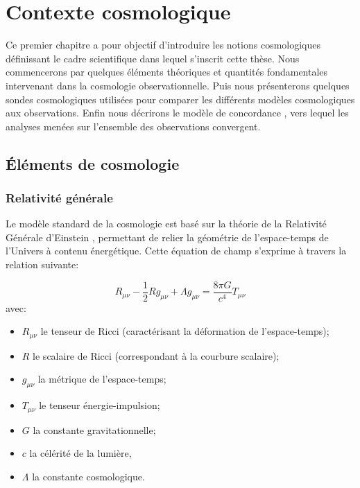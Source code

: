 \documentclass[../main/main.tex]{subfiles}
\begin{document}
\dominitoc
\faketableofcontents
\chapter{Contexte cosmologique}\label{cp:cosmo}

\minitoc
\vspace{2cm}
Ce premier chapitre a pour objectif d'introduire les notions
cosmologiques définissant le cadre scientifique dans lequel s'inscrit
cette thèse. Nous commencerons par quelques éléments
théoriques et quantités fondamentales intervenant dans la cosmologie observationnelle. Puis nous
présenterons quelques sondes cosmologiques utilisées pour comparer les
différents modèles
cosmologiques aux observations. Enfin nous décrirons le modèle de
concordance \lcdm, vers lequel les analyses menées sur l'ensemble des
observations convergent.
\newpage
\section{\'Eléments de cosmologie}\label{sec:11}

\subsection{Relativité générale}

Le modèle standard de la cosmologie est basé sur la théorie de la
Relativité Générale d'Einstein
\citep{Einstein1915c,Einstein1915a,Einstein1915b}, permettant de relier la géométrie
de l'espace-temps de l'Univers à contenu énergétique. Cette équation de champ s'exprime à travers la relation suivante:

\begin{equation}
  \label{eq:generalrelativity}
  R_{\mu\nu}-\frac{1}{2}Rg_{\mu\nu}+\Lambda g_{\mu\nu}=\frac{8\pi G}{c^{4}}T_{\mu\nu}
\end{equation}
avec:
\begin{itemize}[noitemsep, label=$\diamondsuit$]
\item $R_{\mu\nu}$ le tenseur de Ricci (caractérisant la déformation
  de l'espace-temps);
\item $R$ le scalaire de Ricci (correspondant à la courbure
  scalaire);
\item $g_{\mu\nu}$ la métrique de l'espace-temps;
\item $T_{\mu\nu}$ le tenseur énergie-impulsion;
\item $G$ la constante gravitationnelle;
\item $c$ la célérité de la lumière,
\item $\Lambda$ la constante cosmologique.
\end{itemize}
\end{document}
